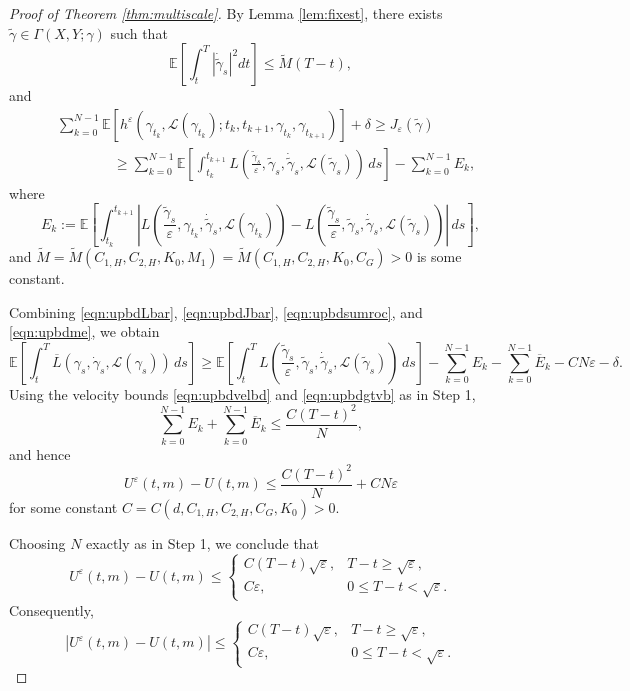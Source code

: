 \documentclass[reqno,11pt]{amsart}
\numberwithin{equation}{section}
\newcommand{\e}{\varepsilon}
\newcommand{\ep}{\varepsilon}
\renewcommand{\bar}{\overline}
\begin{document}
\begin{proof}[Proof of Theorem \ref{thm:multiscale}]
By Lemma \ref{lem:fixest}, there exists $\tilde{\gamma} \in \Gamma(X,Y; \gamma)$ such that
\begin{equation}\label{eqn:upbdgtvb}
\mathbb{E} \left[ \int_{t}^T \left|\dot{\tilde{\gamma}}_s\right|^2 dt \right]
\le \tilde{M} (T-t),
\end{equation}
and
\begin{equation}\label{eqn:upbdme}
\begin{aligned}
&\sum_{k=0}^{N-1}\mathbb{E}\left[h^\e \left(\gamma_{t_k}, \mathcal{L}(\gamma_{t_k}); t_k,t_{k+1},
\gamma_{t_k},\gamma_{t_{k+1}}\right)\right]+\delta \geq J_\ep (\tilde{\gamma})\\
& \qquad \qquad\geq \sum_{k=0}^{N-1}
\mathbb{E} \left[\int_{t_k}^{t_{k+1}}
L\left(\frac{\tilde{\gamma}_s}{\e},\tilde{\gamma}_s,
\dot{\tilde{\gamma}}_s,
\mathcal{L}\left(\tilde{\gamma}_s\right)
\right)\,ds\right]-\sum_{k=0}^{N-1} E_k,
\end{aligned}
\end{equation}
where
\[
    E_k:= \mathbb{E} \left[ \int_{t_k}^{t_{k+1}}\left| L\left(\frac{\tilde{\gamma}_s}{\e},\gamma_{t_k},\dot{\tilde{\gamma}}_s, \mathcal{L}(\gamma_{t_k}) \right)-L\left(\frac{\tilde{\gamma}_s}{\e},\tilde{\gamma}_s,\dot{\tilde{\gamma}}_s,\mathcal{L}\left(\tilde{\gamma}_s\right)\right)\right|\,ds \right],
\]
and $\tilde{M}=\tilde{M}(C_{1,H}, C_{2,H}, K_0, M_1)=\tilde{M}(C_{1,H}, C_{2,H}, K_0, C_G)>0$ is some constant.

Combining \eqref{eqn:upbdLbar}, \eqref{eqn:upbdJbar}, \eqref{eqn:upbdsumroc}, and \eqref{eqn:upbdme}, we obtain
\[
\mathbb{E}\left[\int^T_{t} \bar{L}\left(\gamma_s, \dot{\gamma}_s, \mathcal{L}(\gamma_s) \right) \, ds\right] \geq \mathbb{E} \left[\int_t^T
L\left(\frac{\tilde{\gamma}_s}{\e},\tilde{\gamma}_s,
\dot{\tilde{\gamma}}_s,
\mathcal{L}\left(\tilde{\gamma}_s\right)
\right)\,ds\right]-\sum_{k=0}^{N-1} E_k -\sum_{k=0}^{N-1} \bar{E}_k -CN \ep -\delta.
\]
Using the velocity bounds \eqref{eqn:upbdvelbd} and \eqref{eqn:upbdgtvb} as in Step 1,
\[
\sum_{k=0}^{N-1}E_k+\sum_{k=0}^{N-1}\bar E_k
\le \frac{C(T-t)^2}{N},
\]
and hence
\[
U^\ep(t,m) - U(t,m)\leq  \frac{C(T-t)^2}{N}+CN\e
\]
for some constant $C=C(d,C_{1,H},C_{2,H},C_G, K_0)>0$.


Choosing $N$ exactly as in Step 1, we conclude that
\[
U^\ep(t,m) - U(t,m)\leq \begin{cases}
C(T-t)\sqrt{\ep}, & T-t \ge \sqrt{\varepsilon},\\[4pt]
C\ep, & 0\leq T-t<\sqrt{\ep}.
\end{cases}
\]
Consequently,
\[
    \left|U^\ep(t,m)-U(t,m)\right| \le
\begin{cases}
C(T-t)\sqrt{\ep}, & T-t \ge \sqrt{\ep},\\[4pt]
C\ep, & 0\leq T-t<\sqrt{\ep}.
\end{cases}
\]


\end{proof}
\end{document}
